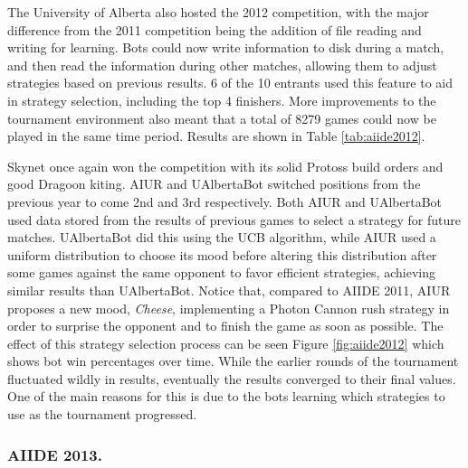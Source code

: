 \documentclass{llncs}
\begin{document}
The University of Alberta also hosted the 2012 competition, with the major difference from the 2011
competition being the addition of file reading and writing for learning. Bots could now write information to disk during a
match, and then read the information during other matches, allowing them to adjust strategies based
on previous results. 6 of the 10 entrants used this feature to aid in strategy selection, including the
top 4 finishers. More improvements to the tournament environment also meant that a total of 8279 games
could now be played in the same time period. Results are shown in Table \ref{tab:aiide2012}.

Skynet once  again won  the competition with  its solid  Protoss build
orders  and  good  Dragoon  kiting.   AIUR  and  UAlbertaBot  switched
positions from  the previous  year to come  2nd and  3rd respectively.
Both  AIUR  and UAlbertaBot  used  data  stored  from the  results  of
previous games  to select a strategy for  future matches.  UAlbertaBot
did  this  using  the  UCB  \cite{auer2002finite} algorithm,  while  AIUR  used  a  uniform
distribution  to choose  its  mood before  altering this  distribution
after  some  games  against  the  same  opponent  to  favor  efficient
strategies, achieving  similar results than  UAlbertaBot. Notice that,
compared  to AIIDE 2011,  AIUR proposes  a new  mood, \textit{Cheese},
implementing a  Photon Cannon rush  strategy in order to  surprise the
opponent and  to finish the game  as soon as possible.   The effect of
this strategy selection process can be seen Figure \ref{fig:aiide2012}
which shows bot  win percentages over time.  While  the earlier rounds
of the tournament fluctuated wildly in results, eventually the results
converged to their  final values. One of the main  reasons for this is
due to  the bots  learning which strategies  to use as  the tournament
progressed.

\subsubsection{AIIDE 2013.}
\end{document}
